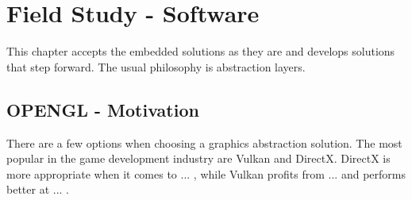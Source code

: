 



\chapter*{Field Study - Software}
    This chapter accepts the embedded solutions as they are and develops solutions that step forward. 
    The usual philosophy is abstraction layers.

    \section*{OPENGL - Motivation}
        There are a few options when choosing a graphics abstraction solution. The most popular in the game development industry are Vulkan and DirectX. DirectX is more appropriate when it comes to ... , while Vulkan profits from ... and performs better at ... .

